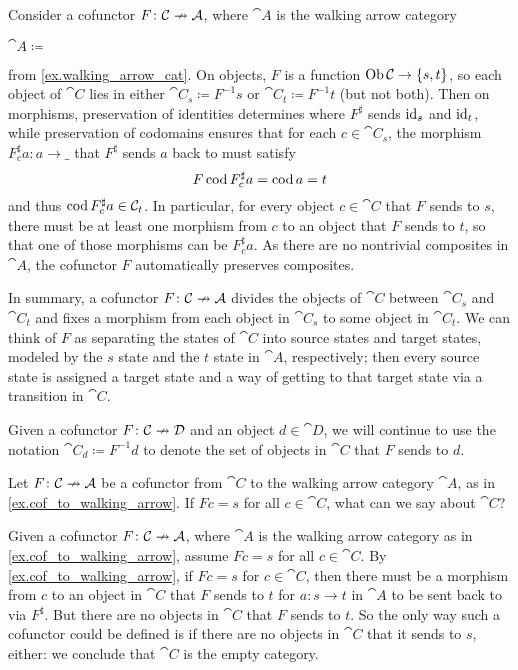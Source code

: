 \documentclass[Book-Poly]{subfiles}
\begin{document}
\begin{example} \label{ex.cof_to_walking_arrow}
Consider a cofunctor $F\colon\mathcal{C}\nrightarrow\mathcal{A}$, where $\cat{A}$ is the walking arrow category
\begin{center}
    $\cat{A}\coloneqq\:$
\end{center}
from \cref{ex.walking_arrow_cat}.
On objects, $F$ is a function $\operatorname{Ob}\mathcal{C}\to\{s,t\}$, so each object of $\cat{C}$ lies in either $\cat{C}_s\coloneqq F^{-1}s$ or $\cat{C}_t\coloneqq F^{-1}t$ (but not both).
Then on morphisms, preservation of identities determines where $F^\sharp$ sends $\mathrm{id}_s$ and $\mathrm{id}_t$, while preservation of codomains ensures that for each $c\in\cat{C}_s$, the morphism $F^\sharp_c a\colon a\to\_$ that $F^\sharp$ sends $a$ back to must satisfy
\[
    F\operatorname{cod} F^\sharp_c a=\operatorname{cod} a=t
\]
and thus $\operatorname{cod} F^\sharp_c a\in\mathcal{C}_t$.
In particular, for every object $c\in\cat{C}$ that $F$ sends to $s$, there must be at least one morphism from $c$ to an object that $F$ sends to $t$, so that one of those morphisms can be $F^\sharp_c a$.
As there are no nontrivial composites in $\cat{A}$, the cofunctor $F$ automatically preserves composites.

In summary, a cofunctor $F\colon\mathcal{C}\nrightarrow\mathcal{A}$ divides the objects of $\cat{C}$ between $\cat{C}_s$ and $\cat{C}_t$ and fixes a morphism from each object in $\cat{C}_s$ to some object in $\cat{C}_t$.
We can think of $F$ as separating the states of $\cat{C}$ into source states and target states, modeled by the $s$ state and the $t$ state in $\cat{A}$, respectively; then every source state is assigned a target state and a way of getting to that target state via a transition in $\cat{C}$.
\end{example}

Given a cofunctor $F\colon\mathcal{C}\nrightarrow\mathcal{D}$ and an object $d\in\cat{D}$, we will continue to use the notation $\cat{C}_d\coloneqq F^{-1}d$ to denote the set of objects in $\cat{C}$ that $F$ sends to $d$.

\begin{exercise}
Let $F\colon\mathcal{C}\nrightarrow\mathcal{A}$ be a cofunctor from $\cat{C}$ to the walking arrow category $\cat{A}$, as in \cref{ex.cof_to_walking_arrow}.
If $Fc=s$ for all $c\in\cat{C}$, what can we say about $\cat{C}$?
\begin{solution}
Given a cofunctor $F\colon\mathcal{C}\nrightarrow\mathcal{A}$, where $\cat{A}$ is the walking arrow category as in \cref{ex.cof_to_walking_arrow}, assume $Fc=s$ for all $c\in\cat{C}$.
By \cref{ex.cof_to_walking_arrow}, if $Fc=s$ for $c\in\cat{C}$, then there must be a morphism from $c$ to an object in $\cat{C}$ that $F$ sends to $t$ for $a\colon s\to t$ in $\cat{A}$ to be sent back to via $F^\sharp$.
But there are no objects in $\cat{C}$ that $F$ sends to $t$.
So the only way such a cofunctor could be defined is if there are no objects in $\cat{C}$ that it sends to $s$, either: we conclude that $\cat{C}$ is the empty category.
\end{solution}
\end{exercise}
\end{document}
